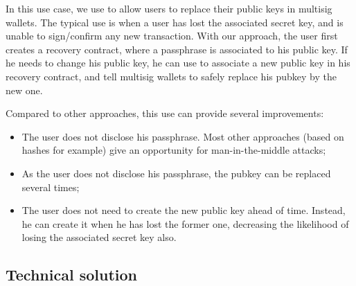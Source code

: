 \documentclass[10pt,a4paper]{article}
\begin{document}
In this use case, we use \zksnarks{} to allow users to replace their
public keys in multisig wallets. The typical use is when a user has
lost the associated secret key, and is unable to sign/confirm any new
transaction. With our approach, the user first creates a recovery
contract, where a passphrase is associated to his public key. If he
needs to change his public key, he can use \zksnarks{} to associate a new
public key in his recovery contract, and tell multisig wallets to
safely replace his pubkey by the new one.

Compared to other approaches, this use can provide several
improvements:
\begin{itemize}
\item The user does not disclose his passphrase. Most other approaches
  (based on hashes for example) give an opportunity for
  man-in-the-middle attacks;
\item As the user does not disclose his passphrase, the pubkey can be
  replaced several times;
\item The user does not need to create the new public key ahead of
  time. Instead, he can create it when he has lost the former one,
  decreasing the likelihood of losing the associated secret key also.
\end{itemize}

\subsection{Technical solution}
\end{document}
